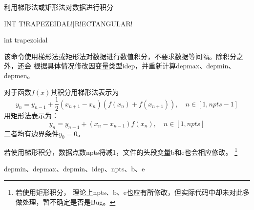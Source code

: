 \label{cmd:int}

利用梯形法或矩形法对数据进行积分

\begin{SACSTX}
INT T!RAPEZEIDAL!|R!ECTANGULAR!
\end{SACSTX}

\begin{SACDFT}
int trapezoidal
\end{SACDFT}

该命令使用梯形法或矩形法对数据进行数值积分，不要求数据等间隔。除积分之外，还会
根据具体情况修改因变量类型idep，并重新计算depmax、depmin、depmen。

对于函数$f(x)$其积分用梯形法表示为
\[
    y_n = y_{n-1} + \frac{1}{2}(x_{n+1}-x_n) (f(x_n)+f(x_{n+1})), \quad n\in[1,npts-1]
\]
用矩形法表示为：
\[
    y_n = y_{n-1} + (x_n-x_{n-1})f(x_n), \quad n\in[1,npts]
\]
二者均有边界条件$y_0=0$。

若使用梯形积分，数据点数npts将减1，文件的头段变量b和e也会相应修改。
\footnote{若使用矩形积分，
理论上npts、b、e也应有所修改，但实际代码中却未对此多做处理，暂不确定是否是Bug。}

depmin、depmax、depmin、idep、npts、b、e
